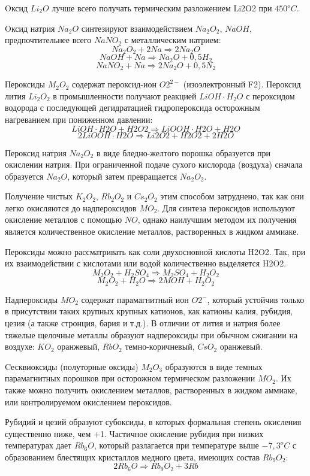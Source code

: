 \documentclass[11pt]{article}
\begin{document}
Oксид $Li_2O$ лучше всего получать термическим разложением Li2O2 при $450^o C$.

Oксид натрия $Na_2O$ синтезируют взаимодействием $Na_2O_2$, $NaOH$, предпочтительнее всего $NaNO_2$ с металлическим натрием:
$$Na_2O_2 + 2Na \Rightarrow 2Na_2O$$
$$NaOH + Na \Rightarrow Na_2O + 0,5H_2$$
$$NaNO_2 + Na \Rightarrow 2Na_2O + 0,5N_2$$

Пероксиды $M_2O_2$ содержат пероксид-ион $O2^{2-}$
(изоэлектронный F2). Пероксид
лития $Li_2O_2$ в промышленности получают реакцией $LiOH\cdot H_2O$ с пероксидом водорода с
последующей дегидратацией гидропероксида осторожным нагреванием при пониженном
давлении:
$$LiOH\cdot H2O + H2O2 \Rightarrow LiOOH\cdot H2O + H2O$$
$$2LiOOH \cdot H2O \Rightarrow Li2O2 + H2O2 + 2H2O$$

Пероксид натрия $Na_2O_2$ в виде бледно-желтого порошка образуется при окислении
натрия. При ограниченной подаче сухого кислорода (воздуха) сначала образуется $Na_2O$,
который затем превращается $Na_2O_2$.

Получение чистых $K_2O_2$, $Rb_2O_2$ и $Cs_2O_2$ этим способом затруднено, так как они
легко окисляются до надпероксидов $MO_2$. Для синтеза пероксидов используют окисление
металлов с помощью $NO$, однако наилучшим методом их получения является
количественное окисление металлов, растворенных в жидком аммиаке. 

Пероксиды можно
рассматривать как соли двухосновной кислоты H2O2. Так, при их взаимодействии с
кислотами или водой количественно выделяется H2O2.
$$M_2O_2 + H_2SO_4 \Rightarrow M_2SO_4 + H_2O_2$$
$$M_2O_2 + H_2O \Rightarrow 2MOH + H_2O_2$$

Hадпероксиды $MO_2$ содержат парамагнитный ион $O2^-$, который устойчив только в
присутствии таких крупных крупных катионов, как катионы калия, рубидия, цезия (а
также стронция, бария и т.д.). В отличии от лития и натрия более тяжелые щелочные
металлы образуют надпероксиды при обычном сжигании на воздухе: $KO_2$ оранжевый,
$RbO_2$ темно-коричневый, $CsO_2$ оранжевый.

Cесквиоксиды (полуторные оксиды) $M_2O_3$ образуются в виде темных
парамагнитных порошков при осторожном термическом разложении $MO_2$. Их также
можно получить окислением металлов, растворенных в жидком аммиаке, или
контролируемом окислением пероксидов.

Рубидий и цезий образуют субоксиды, в которых формальная степень окисления
существенно ниже, чем +1. Частичное окисление рубидия при низких температурах дает
$Rb_6O$, который разлагается при температуре выше $-7,3^oC$ с образованием блестящих
кристаллов медного цвета, имеющих состав $Rb_9O_2$:
$$2Rb_6O \Rightarrow Rb_9O_2 + 3Rb$$
\end{document}
